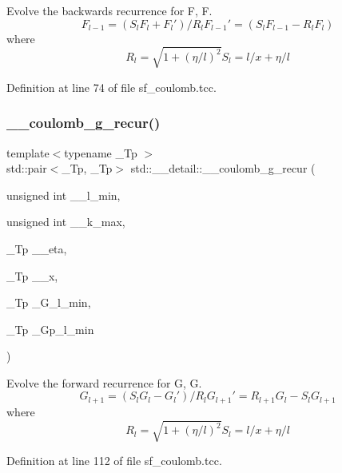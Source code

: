 Evolve the backwards recurrence for F, F\textquotesingle{}. \[ F_{l-1} = (S_l F_l + F_l') / R_l F_{l-1}' = (S_l F_{l-1} - R_l F_l) \] where \[ R_l = \sqrt{1 + (\eta / l)^2} S_l = l / x + \eta / l \] 

Definition at line 74 of file sf\+\_\+coulomb.\+tcc.

\mbox{\label{namespacestd_1_1____detail_ad3bcd9e0587db5699088065900382e8b}} 
\subsubsection{\texorpdfstring{\+\_\+\+\_\+coulomb\+\_\+g\+\_\+recur()}{\_\_coulomb\_g\_recur()}}
{\footnotesize\ttfamily template$<$typename \+\_\+\+Tp $>$ \\
std\+::pair$<$\+\_\+\+Tp, \+\_\+\+Tp$>$ std\+::\+\_\+\+\_\+detail\+::\+\_\+\+\_\+coulomb\+\_\+g\+\_\+recur (\begin{DoxyParamCaption}\item[{unsigned int}]{\+\_\+\+\_\+l\+\_\+min,  }\item[{unsigned int}]{\+\_\+\+\_\+k\+\_\+max,  }\item[{\+\_\+\+Tp}]{\+\_\+\+\_\+eta,  }\item[{\+\_\+\+Tp}]{\+\_\+\+\_\+x,  }\item[{\+\_\+\+Tp}]{\+\_\+\+G\+\_\+l\+\_\+min,  }\item[{\+\_\+\+Tp}]{\+\_\+\+Gp\+\_\+l\+\_\+min }\end{DoxyParamCaption})}

Evolve the forward recurrence for G, G\textquotesingle{}. \[ G_{l+1} = (S_l G_l - G_l')/R_l G_{l+1}' = R_{l+1} G_l - S_l G_{l+1} \] where \[ R_l = \sqrt{1 + (\eta / l)^2} S_l = l / x + \eta / l \] 

Definition at line 112 of file sf\+\_\+coulomb.\+tcc.

\mbox{\label{namespacestd_1_1____detail_a568c1e2b831de815e9ffb1b9c9fe1170}} 
